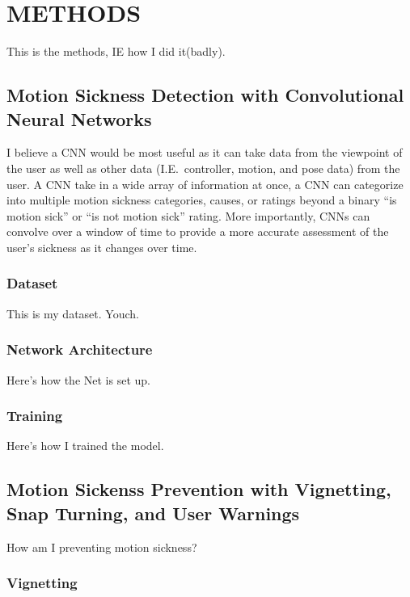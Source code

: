 \chapter{METHODS}
\label{ch:methods}

This is the methods, IE how I did it(badly).

\section{Motion Sickness Detection with Convolutional Neural Networks}
\label{sec:detection}

I believe a CNN would be most useful as it can take data from the viewpoint of the user as well as other data (I.E.\ controller, motion, and pose data) from the user.
A CNN take in a wide array of information at once, a CNN can categorize into multiple motion sickness categories, causes, or ratings beyond a binary ``is motion sick'' or ``is not motion sick'' rating.
More importantly, CNNs can convolve over a window of time to provide a more accurate assessment of the user's sickness as it changes over time.

\subsection{Dataset}
\label{subsec:dataset}

This is my dataset.
Youch.

\subsection{Network Architecture}
\label{subsec:architecture}

Here's how the Net is set up.

\subsection{Training}
\label{subsec:training}

Here's how I trained the model.

\section{Motion Sickenss Prevention with Vignetting, Snap Turning, and User Warnings}
\label{sec:prevention}

How am I preventing motion sickness?

\subsection{Vignetting}
\label{subsec:vignetting}

